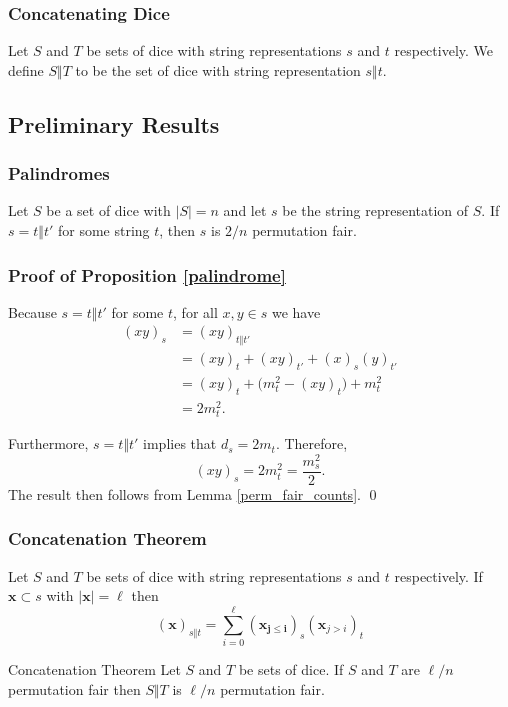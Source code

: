 \documentclass[aspectratio=169]{beamer}
\begin{document}
\begin{frame}[triangle=siiblue]
\frametitle{Concatenating Dice}
\begin{siidefinition}{}{}
Let $S$ and $T$ be sets of dice with string representations $s$ and $t$ respectively.   We define $S \Vert T$ to be the set of dice with string representation $s \Vert t$. 
\end{siidefinition}
\end{frame}

\subsection{Preliminary Results}
\begin{frame}[triangle=siiblue]
\frametitle{Palindromes}
\begin{siiproposition}[label=palindrome]{}{}
Let $S$ be a set of dice with $|S| = n$ and let $s$ be the string representation of $S$.  If $s = t \Vert t'$ for some string $t$,  then $s$ is $2/n$ permutation fair. 
\end{siiproposition}
\end{frame}

\begin{frame}[triangle=siiblue]
\frametitle{Proof of Proposition \ref{palindrome}}
Because $s = t \Vert t'$ for some $t$, for all $x,y \in s$ we have 
\begin{equation}\nonumber
\begin{split}
(xy)_s &= (xy)_{t \Vert t'} \\
&= (xy)_t + (xy)_{t'} + (x)_s(y)_{t'} \\
&= (xy)_t + \big(m_t^2 - (xy)_t\big) + m_t^2 \\
&= 2m_t^2.
\end{split}
\end{equation}

\vfill

Furthermore, $s = t \Vert t'$ implies that $d_s = 2m_t$. Therefore,
\begin{equation*}
(xy)_s = 2m_t^2 = \frac{m_s^2}{2}.
\end{equation*}
The result then follows from Lemma \ref{perm_fair_counts}. \qed
\end{frame}


\begin{frame}[triangle=siiblue]
\frametitle{Concatenation Theorem}
\begin{siilemma}[label=perm_fair_cat_counts]{}{}
Let $S$ and $T$ be sets of dice with string representations $s$ and $t$ respectively. If $\mathbf{x} \subset s$ with $|\mathbf{x}| = \ell$ then
\begin{equation*}
(\mathbf{x})_{s \Vert t} = \sum_{i=0}^{\ell} (\mathbf{x_{j \leq i}})_s (\mathbf{x}_{j > i})_t
\end{equation*}
\end{siilemma}

\vfill
 
\begin{siitheorem}[label=mn_perm_fair]{Concatenation Theorem}{}
Let $S$ and $T$ be sets of dice. If $S$ and $T$ are $\ell/n$ permutation fair then $S \Vert T$ is $\ell/n$ permutation fair.
\end{siitheorem}
\end{frame}
\end{document}
